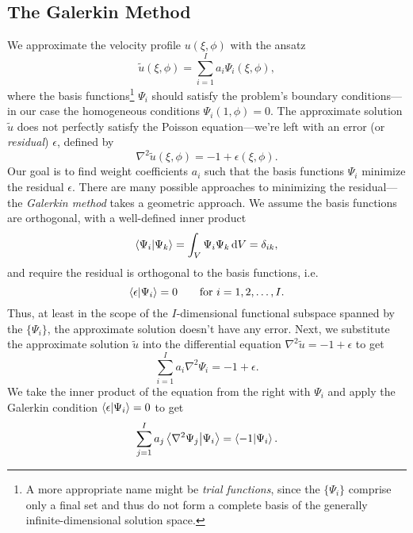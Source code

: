\documentclass[11pt, a4paper]{article}
\newcommand{\diff}{\mathop{}\!\mathrm{d}} %
\renewcommand{\t}[1]{\tilde{#1}}
\renewcommand{\laplacian}{\nabla^{2}}
\begin{document}
\subsection{The Galerkin Method}
We approximate the velocity profile $ u(\xi, \phi) $ with the ansatz
\begin{equation*}
	\t{u}(\xi, \phi) = \sum_{i=1}^{I} a_{i}\Psi_{i}(\xi, \phi),
\end{equation*}
where the basis functions\footnote{A more appropriate name might be \textit{trial functions}, since the $ \{\Psi_{i}\} $ comprise only a final set and thus do not form a complete basis of the generally infinite-dimensional solution space.} $ \Psi_{i} $ should satisfy the problem's boundary conditions---in our case the homogeneous conditions $ \Psi_{i}(1, \phi) = 0 $. The approximate solution $ \t{u} $ does not perfectly satisfy the Poisson equation---we're left with an error (or \textit{residual}) $ \epsilon $, defined by
\begin{equation*}
	\laplacian \t{u}(\xi, \phi) = -1 + \epsilon(\xi, \phi).
\end{equation*}
Our goal is to find weight coefficients $ a_{i} $ such that the basis functions $ \Psi_{i} $ minimize the residual $ \epsilon $. There are many possible approaches to minimizing the residual---the \textit{Galerkin method} takes a geometric approach. We assume the basis functions are orthogonal, with a well-defined inner product
\begin{equation*}
	\ip{\Psi_{i}}{\Psi_{k}} = \int_{V}\Psi_{i}\Psi_{k} \diff V = \delta_{ik},
\end{equation*}
and require the residual is orthogonal to the basis functions, i.e.
\begin{equation*}
	\ip{\epsilon}{\Psi_{i}} = 0 \qquad \text{for } i = 1, 2, \ldots, I.
\end{equation*}
Thus, at least in the scope of the $ I $-dimensional functional subspace spanned by the $ \{\Psi_{i} \} $, the approximate solution doesn't have any error. Next, we substitute the approximate solution $ \t{u} $ into the differential equation $ \laplacian \t{u} = -1 + \epsilon $ to get
\begin{equation*}
	\sum_{i = 1}^{I}a_{i}\laplacian \Psi_{i} = -1 + \epsilon.
\end{equation*}
We take the inner product of the equation from the right with $ \Psi_{i} $ and apply the Galerkin condition $ \ip{\epsilon}{\Psi_{i}} = 0 $ to get
\begin{equation*}
	\sum_{j = 1}^{I}a_{j} \ip{\laplacian\Psi_{j}}{\Psi_{i}} = \ip{-1}{\Psi_{i}}.
\end{equation*}
\end{document}
